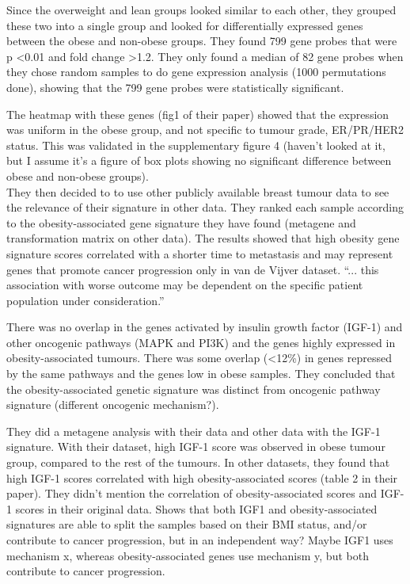 \documentclass[a4paper, 11pt]{article}
\begin{document}
Since the overweight and lean groups looked similar to each other, they grouped these two into a single group and looked for differentially expressed genes between the obese and non-obese groups.
They found 799 gene probes that were p \textless 0.01 and fold change \textgreater 1.2.
They only found a median of 82 gene probes when they chose random samples to do gene expression analysis (1000 permutations done), showing that the 799 gene probes were statistically significant.

The heatmap with these genes (fig1 of their paper) showed that the expression was uniform in the obese group, and not specific to tumour grade, ER/PR/HER2 status.
This was validated in the supplementary figure 4 (haven't looked at it, but I assume it's a figure of box plots showing no significant difference between obese and non-obese groups).\\

They then decided to to use other publicly available breast tumour data to see the relevance of their signature in other data.
They ranked each sample according to the obesity-associated gene signature they have found (metagene and transformation matrix on other data).
The results showed that high obesity gene signature scores correlated with a shorter time to metastasis and may represent genes that promote cancer progression only in van de Vijver dataset.
``... this association with worse outcome may be dependent on the specific patient population under consideration.''

There was no overlap in the genes activated by insulin growth factor (IGF-1) and other oncogenic pathways (MAPK and PI3K) and the genes highly expressed in obesity-associated tumours.
There was some overlap (\textless 12\%) in genes repressed by the same pathways and the genes low in obese samples.
They concluded that the obesity-associated genetic signature was distinct from oncogenic pathway signature (different oncogenic mechanism?).

They did a metagene analysis with their data and other data with the IGF-1 signature.
With their dataset, high IGF-1 score was observed in obese tumour group, compared to the rest of the tumours.
In other datasets, they found that high IGF-1 scores correlated with high obesity-associated scores (table 2 in their paper).
They didn't mention the correlation of obesity-associated scores and IGF-1 scores in their original data.
Shows that both IGF1 and obesity-associated signatures are able to split the samples based on their BMI status, and/or contribute to cancer progression, but in an independent way?
Maybe IGF1 uses mechanism x, whereas obesity-associated genes use mechanism y, but both contribute to cancer progression.
\end{document}
